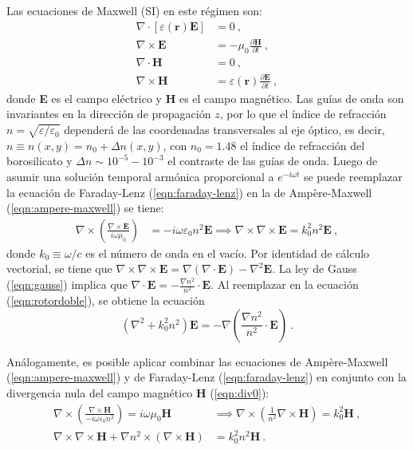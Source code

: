 Las ecuaciones de Maxwell (SI) en este régimen son:
\begin{align}
	\nabla\cdot\left[\varepsilon(\textbf{r})\textbf{E}\right] &= 0 \ , \label{eqn:gauss}
	\\	
	\nabla\times\textbf{E} &= -\mu_0 \frac{\partial \textbf{H}}{\partial t} \ , \label{eqn:faraday-lenz}
	\\	
	\nabla\cdot\textbf{H} &= 0 \ , \label{eqn:div0}
	\\	
	\nabla\times\textbf{H} &=\varepsilon(\textbf{r}) \frac{\partial \textbf{E}}{\partial t} \ , \label{eqn:ampere-maxwell}
\end{align}
donde \textbf{E} es el campo eléctrico y \textbf{H} es el campo magnético. Las guías de onda son invariantes en la dirección de propagación $z$, por lo que el índice de refracción $n=\sqrt{\varepsilon/\varepsilon_0}$ dependerá de las coordenadas transversales al eje óptico, es decir, $n \equiv n(x,y) = n_0 + \Delta n(x,y)$, con $n_0=1.48$ el índice de refracción del borosilicato y $\Delta n \sim 10^{-5}-10^{-3}$ el contraste de las guías de onda. Luego de asumir una solución temporal armónica proporcional a $e^{-i\omega t}$ se puede reemplazar la ecuación de Faraday-Lenz (\ref{eqn:faraday-lenz}) en la de Ampère-Maxwell (\ref{eqn:ampere-maxwell}) se tiene:
\begin{align}
	\nabla\times\left(\frac{\nabla\times\textbf{E}}{i\omega\mu_0}\right) &= -i\omega \varepsilon_0 n^2 \textbf{E} \implies \nabla\times\nabla\times\textbf{E} = k_0^2n^2\textbf{E} \ , \label{eqn:rotordoble}
\end{align}
donde $k_0 \equiv \omega/c$ es el número de onda en el vacío. Por identidad de cálculo vectorial, se tiene que $\nabla\times\nabla\times\textbf{E} = \nabla(\nabla\cdot\textbf{E}) - \nabla^2\textbf{E}$. La ley de Gauss (\ref{eqn:gauss}) implica que $\nabla\cdot \textbf{E} = -\frac{\nabla n^2}{n^2}\cdot\textbf{E}$. Al reemplazar en la ecuación (\ref{eqn:rotordoble}), se obtiene la ecuación 
\begin{equation}
	\left(\nabla^2  + k_0^2n^2\right)\textbf{E} = -\nabla\left( \frac{\nabla n^2}{n^2} \cdot \textbf{E}  \right) \ . \label{eqn:helmholz}
\end{equation}

Análogamente, es posible aplicar combinar las ecuaciones de Ampère-Maxwell (\ref{eqn:ampere-maxwell}) y de Faraday-Lenz (\ref{eqn:faraday-lenz}) en conjunto con la divergencia nula del campo magnético \textbf{H} (\ref{eqn:div0}):
\begin{align}
	\nabla\times \left(\frac{\nabla\times\textbf{H}}{-i\omega \varepsilon_0 n^2}\right) = i\omega \mu_0 \textbf{H} &\implies \nabla\times \left(\frac{1}{n^2}\nabla\times\textbf{H}\right) = k_0^2 \textbf{H} \ ,
	\nonumber
	\\
	\nabla\times\nabla\times\textbf{H} + \nabla n^2 \times \left( \nabla\times\textbf{H}\right)
	&= 
	  k_0^2 n^2\textbf{H} \ .
	 	\nonumber
\end{align}

